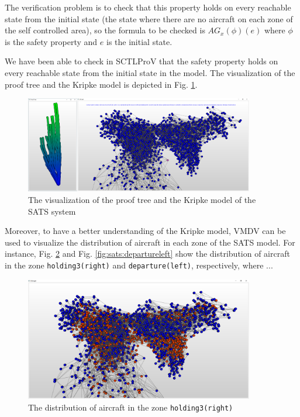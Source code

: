 \documentclass[runningheads]{llncs}
\newcommand\tool[1]{\textsf{#1}}
\begin{document}
\begin{example} 
	The verification problem is to check that this
	property holds on every reachable state from the initial state (the
	state where there are no aircraft on each zone of the self controlled
	area), so the formula to be checked is $AG_x(\phi)(e)$ where $\phi$ is 
	the safety property and $e$ is the initial state.
	
	We have been able to check in
	\textsf{SCTLProV} that the safety property holds on every reachable state from the initial state in the model.
	The visualization of the proof tree and the Kripke model is depicted in Fig. \ref{fig:sats}.
	
	\begin{figure}[h!]
		\centering
		\includegraphics[width=10cm]{./sats_prooftree_model.png}
		\caption{The visualization of the proof tree and the Kripke model of the SATS system}
		\label{fig:sats}
	\end{figure}

	Moreover, to have a better understanding of the Kripke model, \tool{VMDV} can be used to visualize the distribution of aircraft in each zone of the SATS model. For instance, Fig. \ref{fig:sats:holding3right} and Fig. \ref{fig:sats:departureleft} show the distribution of aircraft in the zone {\tt holding3(right)} and {\tt departure(left)}, respectively, where ...
	
	\begin{figure}[h!]
		\centering
		\includegraphics[width=10cm]{sats_holding3right.png}
		\caption{The distribution of aircraft in the zone {\tt holding3(right)}}
		\label{fig:sats:holding3right}
	\end{figure}


\end{example}
\end{document}
